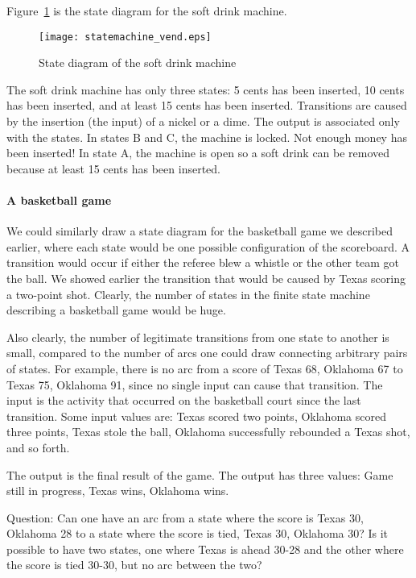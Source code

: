 \documentclass{patt}
\begin{document}
Figure~\ref{fig:statemachine_vend} is the state diagram for the soft drink
machine.

\begin{figure}
\centerline{\texttt{[image: statemachine\_vend.eps]}}
\caption{State diagram of the soft drink machine}
\label{fig:statemachine_vend}
\end{figure}

The soft drink machine has only three states: 5 cents has been inserted,
10 cents has been inserted, and at least 15 cents has been inserted. 
Transitions are caused by the insertion (the input) of a nickel or a dime. 
The output is associated only with the states.  In states
B and C, the machine is locked.  Not enough money has been inserted!  In 
state A, the machine is open so a soft drink can be removed because at 
least 15 cents has been inserted.

\paragraph{A basketball game}
We could similarly draw a state diagram for the basketball game we
described earlier, where each state would be one possible configuration
of the scoreboard.  A transition would occur if either the referee
blew a whistle or the other team got the ball.  We showed earlier the
transition that would be caused by Texas scoring a two-point shot.
Clearly, the number of states in the finite state machine describing a
basketball game would be huge.  

Also clearly, the number of legitimate
transitions from one state to another is small, compared to the number
of arcs one could draw connecting arbitrary pairs of states.  For example,
there is no arc from a score of Texas 68, Oklahoma 67 to Texas 75, Oklahoma 91,
since no single input can cause that transition. The
input is the activity that occurred on the basketball court since the
last transition.  Some input values are: Texas scored two points,
Oklahoma scored three points, Texas stole the ball, Oklahoma
successfully rebounded a Texas shot, and so forth.  

The output is the
final result of the game.  The output has three values: Game still in
progress, Texas wins, Oklahoma wins.

Question: Can one have an arc from a state where the score is Texas 30, 
Oklahoma 28 to a state where the score is tied, Texas 30, Oklahoma 30?  
Is it possible to have two states, one where Texas is ahead 30-28 and
the other where the score is tied 30-30, but no arc between the two?
\end{document}
